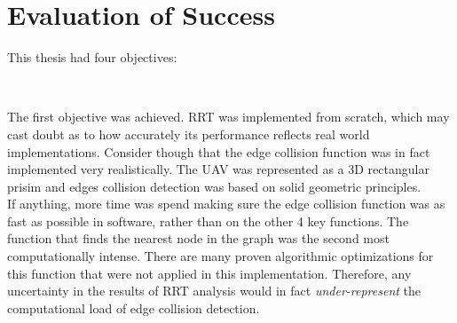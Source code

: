     \begin{table}[H]
    \begin{center}
    \begin{tabular}{|c|c|}
    
    \end{tabular}
    \end{center}
    \end{table}

\section{Evaluation of Success}
    This thesis had four objectives:

    \begin{center}
    \bigskip\noindent{} \\
    \end{center}

    The first objective was achieved. \gls{RRT} was implemented from scratch, which may cast doubt as to how accurately its performance reflects real world implementations. Consider though that the edge collision function was in fact implemented very realistically. The \gls{UAV} was represented as a 3D rectangular prisim and edges collision detection was based on solid geometric principles. \\
    If anything, more time was spend making sure the edge collision function was as fast as possible in software, rather than on the other 4 key functions. The function that finds the nearest node in the graph was the second most computationally intense. There are many proven algorithmic optimizations for this function that were not applied in this implementation. Therefore, any uncertainty in the results of \gls{RRT} analysis would in fact \textit{under-represent} the computational load of edge collision detection. \\

